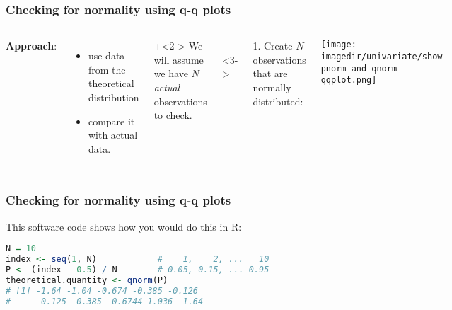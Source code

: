 \begin{frame}\frametitle{Checking for normality using q-q plots}
	\begin{columns}[t]
			\textbf{Approach}: {\color{myOrange}{compare properties}}
			\begin{itemize}
				\item	use data from the theoretical distribution 
				\item	compare it with actual data.
			\end{itemize}
			
			\vspace{24pt}
			\onslide+<2->{
				We will assume we have $N$ \emph{actual} observations to check.
			}
			
			\onslide+<3->{
			1. Create $N$ observations that are normally distributed:
			\begin{center}
				\texttt{[image: \\imagedir/univariate/show-pnorm-and-qnorm-qqplot.png]}
			\end{center}
			}
	\end{columns}

\end{frame}

\begin{frame}[fragile]\frametitle{Checking for normality using q-q plots}
	
	This software code shows how you would do this in R:
	
	\vspace{24pt}
	
	\begin{lstlisting}[language=R]
N = 10
index <- seq(1, N)            #    1,    2, ...   10
P <- (index - 0.5) / N        # 0.05, 0.15, ... 0.95
theoretical.quantity <- qnorm(P)
# [1] -1.64 -1.04 -0.674 -0.385 -0.126
#      0.125  0.385  0.6744 1.036  1.64
	\end{lstlisting}
	
\end{frame}

